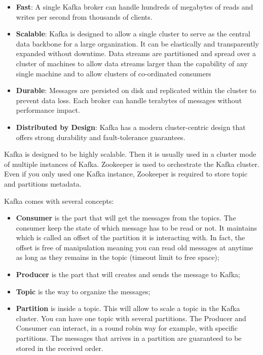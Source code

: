 \begin{itemize}
\item\textbf{Fast}: A single Kafka broker can handle hundreds of megabytes of reads and writes per second from thousands of clients.
\item\textbf{Scalable}: Kafka is designed to allow a single cluster to serve as the central data backbone for a large organization. It can be elastically and transparently expanded without downtime. Data streams are partitioned and spread over a cluster of machines to allow data streams larger than the capability of any single machine and to allow clusters of co-ordinated consumers
\item\textbf{Durable}: Messages are persisted on disk and replicated within the cluster to prevent data loss. Each broker can handle terabytes of messages without performance impact.
\item\textbf{Distributed by Design}: Kafka has a modern cluster-centric design that offers strong durability and fault-tolerance guarantees. 
\end{itemize}

Kafka is designed to be highly scalable. Then it is usually used in a cluster mode of multiple instances of Kafka. Zookeeper is used to orchestrate the Kafka cluster. Even if you only used one Kafka instance, Zookeeper is required to store topic and partitions metadata.

Kafka comes with several concepts:

\begin{itemize}
\item\textbf{Consumer} is the part that will get the messages from the topics. The consumer keep the state of which message has to be read or not. It maintains which is called an offset of the partition it is interacting with. In fact, the offset is free of manipulation meaning you can read old messages at anytime as long as they remains in the topic (timeout limit to free space);
\item\textbf{Producer} is the part that will creates and sends the message to Kafka;
\item\textbf{Topic} is the way to organize the messages;
\item\textbf{Partition} is inside a topic. This will allow to scale a topic in the Kafka cluster. You can have one topic with several partitions. The Producer and Consumer can interact, in a round robin way for example, with specific partitions. The messages that arrives in a partition are guaranteed to be stored in the received order.
\end{itemize}

